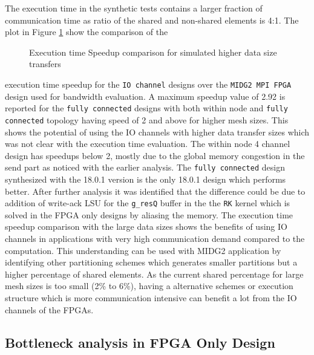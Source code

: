 The execution time in the synthetic tests contains a larger fraction
of communication time as ratio of the shared and non-shared elements
is 4:1. The plot in Figure \ref{plot:bw_speedup} show the comparison of the
\begin{figure}[ht]
	\centering\small
    \scalebox{0.7}{}
    \caption{Execution time Speedup comparison for simulated higher data size transfers}
	\label{plot:bw_speedup}
\end{figure}
execution time speedup for the \texttt{IO channel} designs
over the \texttt{MIDG2 MPI FPGA} design used for bandwidth evaluation.
A maximum speedup value of 2.92 is reported for the \texttt{fully connected}
designs with both within node and \texttt{fully connected} topology
having speed of 2 and above for higher mesh sizes. This shows the potential
of using the IO channels with higher data transfer sizes which was not clear
with the execution time evaluation. The within node 4 channel design has
speedups below 2, mostly due to the global memory congestion in the send
part as noticed with the earlier analysis.
The \texttt{fully connected} design synthesized with the 18.0.1 version is the only
18.0.1 design which performs better. After further analysis it was identified that
the difference could be due to addition of write-ack LSU for the \texttt{g\_resQ}
buffer in the the \texttt{RK} kernel which is solved in the FPGA only designs by aliasing
the memory. The execution time speedup comparison with the large data sizes shows
the benefits of using IO channels in applications with very high communication demand
compared to the computation. This understanding can be used with MIDG2 application
by identifying other partitioning schemes which generates smaller partitions but
a higher percentage of shared elements. As the current shared percentage for large
mesh sizes is too small (2\% to 6\%), having a alternative schemes or execution
structure which is more communication intensive can benefit a lot from the
IO channels of the FPGAs.

\subsection{Bottleneck analysis in FPGA Only Design}

